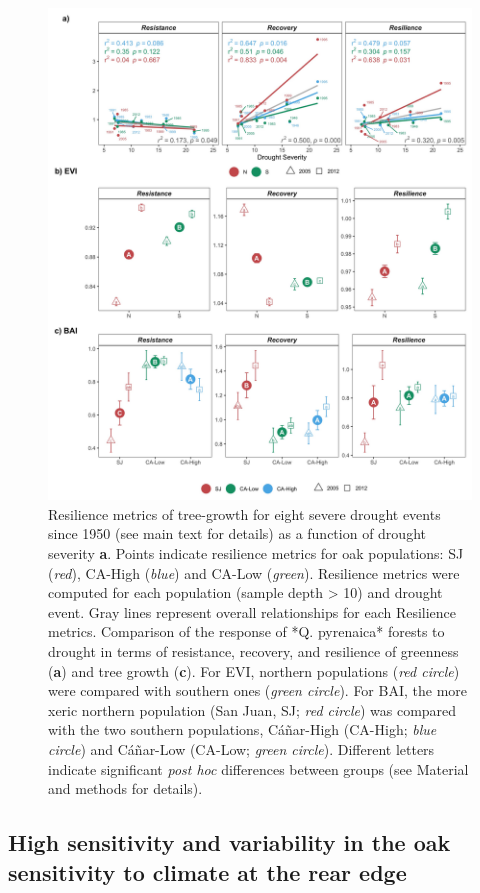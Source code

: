 \begin{figure}
\centering
\includegraphics[width=\textwidth]{img/dendro/dendro-resiliences.jpg}\caption{
Resilience metrics of tree-growth for eight severe drought events since 1950 (see main text for details) as a function of drought severity \textbf{a}. Points indicate resilience metrics for oak populations: SJ (\textit{red}), CA-High (\textit{blue}) and CA-Low (\textit{green}). Resilience metrics were computed for each population (sample depth > 10) and drought event. Gray lines represent overall relationships for each Resilience metrics. Comparison of the response of  *Q. pyrenaica* forests to drought in terms of resistance, recovery, and resilience of greenness (\textbf{a}) and tree growth (\textbf{c}). For EVI, northern populations (\textit{red circle}) were compared with southern ones (\textit{green circle}). For BAI, the more xeric northern population (San Juan, SJ; \textit{red circle}) was compared with the two southern populations, Cáñar-High (CA-High; \textit{blue circle}) and Cáñar-Low (CA-Low; \textit{green circle}). Different letters indicate significant \textit{post hoc} differences between groups (see Material and methods for details).} 
\label{fig:dendro:resilience}
\end{figure}
\hypertarget{sec:dendroHighSensitivity}{%
\subsection{High sensitivity and variability in the oak sensitivity to climate at the rear edge}\label{sec:dendroHighSensitivity}}


